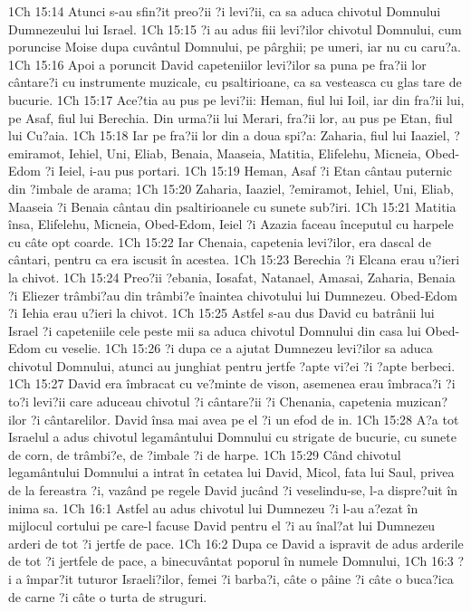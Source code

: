 1Ch 15:14  Atunci s-au sfin?it preo?ii ?i levi?ii, ca sa aduca chivotul Domnului Dumnezeului lui Israel.
1Ch 15:15  ?i au adus fiii levi?ilor chivotul Domnului, cum poruncise Moise dupa cuvântul Domnului, pe pârghii; pe umeri, iar nu cu caru?a.
1Ch 15:16  Apoi a poruncit David capeteniilor levi?ilor sa puna pe fra?ii lor cântare?i cu instrumente muzicale, cu psaltirioane, ca sa vesteasca cu glas tare de bucurie.
1Ch 15:17  Ace?tia au pus pe levi?ii: Heman, fiul lui Ioil, iar din fra?ii lui, pe Asaf, fiul lui Berechia. Din urma?ii lui Merari, fra?ii lor, au pus pe Etan, fiul lui Cu?aia.
1Ch 15:18  Iar pe fra?ii lor din a doua spi?a: Zaharia, fiul lui Iaaziel, ?emiramot, Iehiel, Uni, Eliab, Benaia, Maaseia, Matitia, Elifelehu, Micneia, Obed-Edom ?i Ieiel, i-au pus portari.
1Ch 15:19  Heman, Asaf ?i Etan cântau puternic din ?imbale de arama;
1Ch 15:20  Zaharia, Iaaziel, ?emiramot, Iehiel, Uni, Eliab, Maaseia ?i Benaia cântau din psaltirioanele cu sunete sub?iri.
1Ch 15:21  Matitia însa, Elifelehu, Micneia, Obed-Edom, Ieiel ?i Azazia faceau începutul cu harpele cu câte opt coarde.
1Ch 15:22  Iar Chenaia, capetenia levi?ilor, era dascal de cântari, pentru ca era iscusit în acestea.
1Ch 15:23  Berechia ?i Elcana erau u?ieri la chivot.
1Ch 15:24  Preo?ii ?ebania, Iosafat, Natanael, Amasai, Zaharia, Benaia ?i Eliezer trâmbi?au din trâmbi?e înaintea chivotului lui Dumnezeu. Obed-Edom ?i Iehia erau u?ieri la chivot.
1Ch 15:25  Astfel s-au dus David cu batrânii lui Israel ?i capeteniile cele peste mii sa aduca chivotul Domnului din casa lui Obed-Edom cu veselie.
1Ch 15:26  ?i dupa ce a ajutat Dumnezeu levi?ilor sa aduca chivotul Domnului, atunci au junghiat pentru jertfe ?apte vi?ei ?i ?apte berbeci.
1Ch 15:27  David era îmbracat cu ve?minte de vison, asemenea erau îmbraca?i ?i to?i levi?ii care aduceau chivotul ?i cântare?ii ?i Chenania, capetenia muzican?ilor ?i cântarelilor. David însa mai avea pe el ?i un efod de in.
1Ch 15:28  A?a tot Israelul a adus chivotul legamântului Domnului cu strigate de bucurie, cu sunete de corn, de trâmbi?e, de ?imbale ?i de harpe.
1Ch 15:29  Când chivotul legamântului Domnului a intrat în cetatea lui David, Micol, fata lui Saul, privea de la fereastra ?i, vazând pe regele David jucând ?i veselindu-se, l-a dispre?uit în inima sa.
1Ch 16:1  Astfel au adus chivotul lui Dumnezeu ?i l-au a?ezat în mijlocul cortului pe care-l facuse David pentru el ?i au înal?at lui Dumnezeu arderi de tot ?i jertfe de pace.
1Ch 16:2  Dupa ce David a ispravit de adus arderile de tot ?i jertfele de pace, a binecuvântat poporul în numele Domnului,
1Ch 16:3  ?i a împar?it tuturor Israeli?ilor, femei ?i barba?i, câte o pâine ?i câte o buca?ica de carne ?i câte o turta de struguri.
